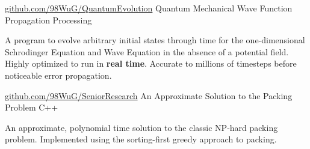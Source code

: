 \begin{cventries}
    \cventry
	{\href{https://github.com/98WuG/QuantumEvolution}{github.com/98WuG/QuantumEvolution}}
	{Quantum Mechanical Wave Function Propagation}
	{Processing}
	{}
    {
		\begin{cvitems}
		\item A program to evolve arbitrary initial states through time for the one-dimensional Schrodinger Equation and Wave Equation in the absence of a potential field. Highly optimized to run in \textbf{real time}. Accurate to millions of timesteps before noticeable error propagation.
		\end{cvitems}
    }
    \cventry
	{\href{https://github.com/98WuG/SeniorResearch}{github.com/98WuG/SeniorResearch}}
	{An Approximate Solution to the Packing Problem}
	{C++}
	{}
    {
		\begin{cvitems}
		\item An approximate, polynomial time solution to the classic NP-hard packing problem. Implemented using the sorting-first greedy approach to packing.
		\end{cvitems}
    }
\end{cventries}
